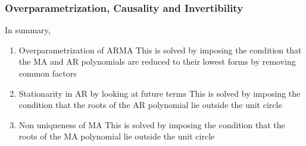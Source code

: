 \documentclass[../../time_series_notes.tex]{subfiles}
\begin{document}
\subsubsection{Overparametrization, Causality and Invertibility}
In summary,
\begin{enumerate}
    \item Overparametrization of ARMA\newline
         This is solved by imposing the condition that the MA and AR polynomials are reduced to their lowest forms by removing common factors
    \item Stationarity in AR by looking at future terms\newline
        This is solved by imposing the condition that the roots of the AR polynomial lie outside the unit circle
    \item Non uniqueness of MA\newline
        This is solved by imposing the condition that the roots of the MA polynomial lie outside the unit circle
\end{enumerate}
\end{document}
